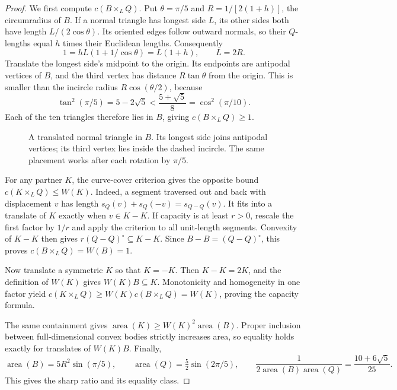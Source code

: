 \begin{proof}
We first compute $c(B\times_L Q)$. Put $\theta=\pi/5$ and
$R=1/[2(1+h)]$, the circumradius of $B$.
If a normal triangle has longest side $L$, its other sides both have length
$L/(2\cos\theta)$. Its oriented edges follow outward normals, so their
$Q$-lengths equal $h$ times their Euclidean lengths. Consequently
\[
 1=hL(1+1/\cos\theta)=L(1+h),\qquad L=2R.
\]
Translate the longest side's midpoint to the origin. Its endpoints are
antipodal vertices of $B$, and the third vertex has distance $R\tan\theta$
from the origin. This is smaller than the incircle radius $R\cos(\theta/2)$,
because
\[
 \tan^2(\pi/5)=5-2\sqrt5
       <\frac{5+\sqrt5}{8}=\cos^2(\pi/10).
\]
Each of the ten triangles therefore lies in $B$, giving $c(B\times_L Q)\ge1$.

\begin{figure}[htbp]
\centering
{}
\caption{A translated normal triangle in $B$. Its longest side joins
antipodal vertices; its third vertex lies inside the dashed incircle.
The same placement works after each rotation by $\pi/5$.}
\label{fig:pentagon-symmetric-reference}
\end{figure}

For any partner $K$, the curve-cover criterion gives the opposite bound
$c(K\times_L Q)\le W(K)$. Indeed, a segment traversed out and back with
displacement $v$ has length
$s_Q(v)+s_Q(-v)=s_{Q-Q}(v)$.
It fits into a translate of $K$ exactly when $v\in K-K$.
If capacity is at least $r>0$, rescale the first factor by $1/r$ and apply
the criterion to all unit-length segments. Convexity of $K-K$ then gives
$r(Q-Q)^\circ\subseteq K-K$.
Since $B-B=(Q-Q)^\circ$, this proves $c(B\times_L Q)=W(B)=1$.

Now translate a symmetric $K$ so that $K=-K$. Then $K-K=2K$, and the
definition of $W(K)$ gives $W(K)B\subseteq K$.
Monotonicity and homogeneity in one factor yield
$c(K\times_L Q)\ge W(K)c(B\times_L Q)=W(K)$,
proving the capacity formula.

The same containment gives
$\operatorname{area}(K)\ge W(K)^2\operatorname{area}(B)$.
Proper inclusion between full-dimensional convex bodies strictly increases
area, so equality holds exactly for translates of $W(K)B$.
Finally,
\[
 \operatorname{area}(B)=5R^2\sin(\pi/5),\qquad
 \operatorname{area}(Q)=\tfrac52\sin(2\pi/5),\qquad
 \frac1{2\operatorname{area}(B)\operatorname{area}(Q)}
    =\frac{10+6\sqrt5}{25}.
\]
This gives the sharp ratio and its equality class.
\end{proof}

